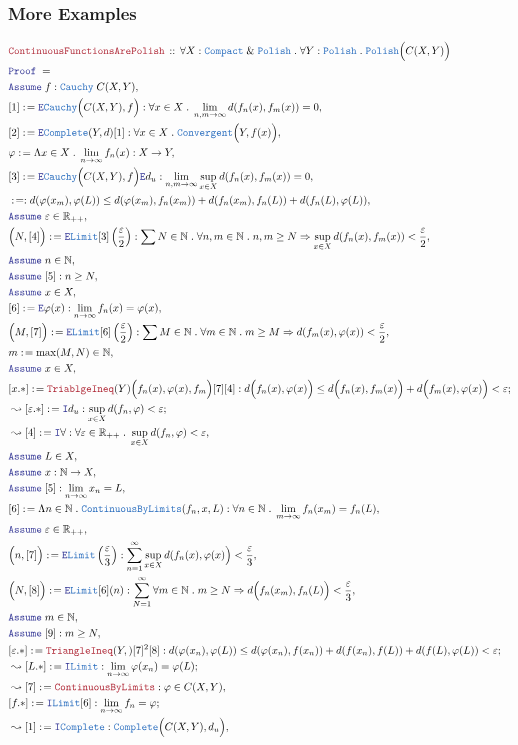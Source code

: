 \documentclass[12pt]{scrartcl}
\newcommand{\TYPE}[1]{\textcolor{NavyBlue}{\mathtt{#1}}}
\newcommand{\LOGIC}[1]{\textcolor{Blue}{\mathtt{#1}}}
\newcommand{\THM}[1]{\textcolor{Maroon}{\mathtt{#1}}}
\renewcommand{\.}{\; . \;}
\newcommand{\de}{: \kern 0.1pc =}
\newcommand{\Theorem}[2]{& \THM{#1} \, :: \, #2 \\ & \Proof = \\ }
\newcommand{\Page}[1]{ \begin{align*} #1 \end{align*}   }
\renewcommand{\And}{\; \& \;}
\newcommand{\Imply}{\Rightarrow}
\newcommand{\Intro}{\LOGIC{I}}
\newcommand{\Elim}{\LOGIC{E}}
\newcommand{\Reals}{\mathbb{R} }
\newcommand{\Nat}{\mathbb{N} }
\newcommand{\Say}[3]{& #1 \de #2 : #3, \\}
\newcommand{\SayIn}[3]{& #1 \de #2 \in #3, \\}
\newcommand{\Conclude}[3]{& #1 \de #2 : #3; \\}
\newcommand{\Derive}[3]{& \leadsto #1 \de #2 : #3, \\}
\newcommand{\DeriveConclude}[3]{& \leadsto #1 \de #2 : #3 ; \\}
\newcommand{\Assume}[2]{& \LOGIC{Assume} \; #1 : #2, \\}
\newcommand{\AssumeIn}[2]{& \LOGIC{Assume} \; #1 \in #2, \\}
\newcommand{\Proof}{\LOGIC{Proof} \; }
\newcommand{\Compact}{\TYPE{Compact}}
\newcommand{\Polish}{\TYPE{Polish}}
\begin{document}
\subsubsection{More Examples}
\Page{
	\Theorem{ContinuousFunctionsArePolish}
	{
		\forall X : \Compact \And \Polish \.
		\forall Y : \Polish \.
		\Polish\Big( C(X,Y) \Big)
	}
	\Assume{f}{\TYPE{Cauchy}\;C(X,Y)}
	\Say{[1]}{\Elim \TYPE{Cauchy}\Big(C(X,Y),f\Big)}
	{
		\forall x \in X \. \lim_{n,m \to \infty}d(f_n(x),f_m(x)) = 0
	}
	\Say{[2]}{\Elim \TYPE{Complete}(Y,d)[1]}
	{
		\forall x \in X \. \TYPE{Convergent}\Big(Y,f(x)\Big)
	}
	\Say{\varphi}{\Lambda x \in X \. \lim_{n \to \infty} f_n(x)}{X \to Y}
	\Say{[3]}{\Elim \TYPE{Cauchy}\Big( C(X,Y),f\Big)\Elim d_u}
	{
		\lim_{n,m \to \infty} \sup_{x \in X} d(f_n(x),f_m(x)) = 0
	}
	\Say{}{}
	{
		d( \varphi(x_m), \varphi(L) ) \le 
		d( \varphi(x_m), f_n(x_m) ) + d(f_n(x_m),f_n(L) )  + d(f_n(L),\varphi(L))
	}
	\AssumeIn{\varepsilon}{\Reals_{++}}
	\Say{\Big(N,[4]\Big)}{\Elim \TYPE{Limit}[3]\left( \frac{\varepsilon}{2} \right) }
	{
		\sum N \in \Nat \. \forall n,m \in \Nat \. n,m \ge N \Imply \sup_{x \in X} d(f_n(x), f_m(x)) < \frac{\varepsilon}{2}
	}
	\AssumeIn{n}{\Nat}
	\Assume{[5]}{n \ge N}
	\AssumeIn{x}{X}
	\Say{[6]}{\Elim \varphi(x)}{\lim_{n \to \infty} f_n(x) = \varphi(x)}
	\Say{\Big(M,[7]\Big)}{\Elim \TYPE{Limit} [6]\left( \frac{\varepsilon}{2} \right)}
	{
		\sum M \in \Nat \. \forall m \in \Nat \. m \ge M \Imply d(f_m(x),\varphi(x)) < \frac{\varepsilon}{2} 
	}
	\SayIn{m}{\max(M,N)}{\Nat}
	\AssumeIn{x}{X}
	\Conclude{[x.*]}{\THM{TriablgeIneq}(Y)\Big(f_n(x),\varphi(x),f_m\Big)[7][4]}
	{
	      d\Big( f_n(x), \varphi(x) \Big) \le
	      d\Big( f_n(x), f_m(x) \Big) + d\Big( f_m(x), \varphi(x) \Big) <
	      \varepsilon
	}
	\DeriveConclude{[\varepsilon.*]}{\Intro d_u}{\sup_{x \in X} d(f_n,\varphi) < \varepsilon}
	\Derive{[4]}{\Intro \forall}{\forall \varepsilon \in \Reals_{++} \. \sup_{x \in X} d(f_n,\varphi)<\varepsilon}
	\AssumeIn{L}{X}
	\Assume{x}{\Nat \to X}
	\Assume{[5]}{\lim_{n \to \infty} x_n = L}
	\Say{[6]}{\Lambda n \in \Nat \. \TYPE{ContinuousByLimits}(f_n,x,L)}
	{
		\forall n \in \Nat \. \lim_{m \to \infty} f_n(x_m) = f_n(L)
	}
	\AssumeIn{\varepsilon}{\Reals_{++}}
	\Say{\Big(n,[7]\Big)}{\Elim \TYPE{Limit}\left(\frac{\varepsilon}{3}\right)}
	{
		\sum^\infty_{n=1} \sup_{x \in X} d( f_n(x), \varphi(x) \Big) < \frac{\varepsilon}{3}
	}
	\Say{\Big(N,[8]\Big)}{\Elim \TYPE{Limit}[6](n)}
	{
		\sum^\infty_{N=1} \forall m \in \Nat \. 
		m \ge N
		\Imply
		d\Big( f_n(x_m), f_n(L) \Big) < \frac{\varepsilon}{3}
	}
	\AssumeIn{m}{\Nat}
	\Assume{[9]}{m \ge N}
	\Conclude{[\varepsilon.*]}{\THM{TriangleIneq}(Y,)[7]^2[8]}
	{
		d( \varphi(x_n),\varphi(L) ) \le
		d( \varphi(x_n), f(x_n) ) + d( f(x_n), f(L) ) + d( f(L),\varphi(L)) <
		\varepsilon
	}
	\DeriveConclude{[L.*]}{\Intro \TYPE{Limit}}{\lim_{n \to \infty} \varphi(x_n) = \varphi(L)}
	\Derive{[7]}{\THM{ContinuousByLimits}}{\varphi \in C(X,Y)}
	\Conclude{[f.*]}{\Intro \TYPE{Limit}[6]}{\lim_{n \to \infty} f_n = \varphi}
	\Derive{[1]}{\Intro \TYPE{Complete}}{\TYPE{Complete}\Big(C(X,Y),d_u\Big)}	
}
\end{document}
